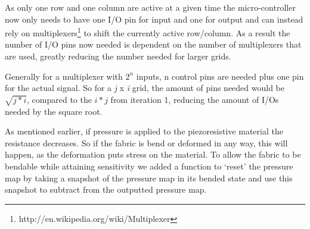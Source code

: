 As only one row and one column are active at a given time the micro-controller now only needs to have one I/O pin for input and one for output and can instead rely on multiplexers\footnote{http://en.wikipedia.org/wiki/Multiplexer} to shift the currently active row/column.
As a result the number of I/O pins now needed is dependent on the number of multiplexers that are used, greatly reducing the number needed for larger grids.

Generally for a multiplexer with \(2^n\) inputs, n control pins are needed plus one pin for the actual signal.
So for a \emph{j} x \emph{i} grid, the amount of pins needed would be \(\sqrt{j*i}\), compared to the \(i*j\) from iteration 1, reducing the amount of I/Os needed by the square root.

As mentioned earlier, if pressure is applied to the piezoresistive material the resistance decreases.
So if the fabric is bend or deformed in any way, this will happen, as the deformation puts stress on the material.
To allow the fabric to be bendable while attaining sensitivity we added a function to `reset' the pressure map by taking a snapshot of the pressure map in its bended state and use this snapshot to subtract from the outputted pressure map.


